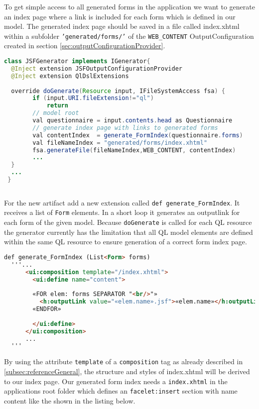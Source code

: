 To get simple access to all generated forms in the application
 we want to generate an index page where a link is included for each form which is defined
in our model.
The generated index page should be saved in a file called index.xhtml within a
subfolder \texttt{'generated/forms/'} of the \texttt{WEB\_CONTENT}
OutputConfiguration created in section \ref{sec:outputConfigurationProvider}.

\begin{lstlisting}[language=Java] 
class JSFGenerator implements IGenerator{
  @Inject extension JSFOutputConfigurationProvider
  @Inject extension QlDslExtensions
  
  override doGenerate(Resource input, IFileSystemAccess fsa) {
        if (input.URI.fileExtension!="ql")
            return
		// model root
        val questionnaire = input.contents.head as Questionnaire
		// generate index page with links to generated forms
        val contentIndex  = generate_FormIndex(questionnaire.forms)
        val fileNameIndex = "generated/forms/index.xhtml"
        fsa.generateFile(fileNameIndex,WEB_CONTENT, contentIndex)
        ...
  }
  ...
 }
      
\end{lstlisting}

For the new artifact add a new extension called \texttt{def
generate\_FormIndex}.
It receives a list of \texttt{Form} elements. In a short loop it generates an
outputlink for each form of the given model. Because \texttt{doGenerate} is
called for each QL resource the generator currently has the limitation that all
QL model elements are defined within the same QL resource to ensure generation of a
correct form index page.

\begin{lstlisting}[language=HTML] 
  def generate_FormIndex (List<Form> forms)
  '''...
      <ui:composition template="/index.xhtml">
        <ui:define name="content">
        
        «FOR elem: forms SEPARATOR "<br/>"»
          <h:outputLink value="«elem.name».jsf">«elem.name»</h:outputLink>
        «ENDFOR»
        
        </ui:define>
      </ui:composition>
      ...
  '''
\end{lstlisting}

By using the attribute \texttt{template} of a \texttt{composition} tag as
already described in \ref{subsec:referenceGeneral}, the structure and styles of
index.xhtml will be derived to our index page. Our generated form index needs a
\texttt{index.xhtml} in the applications root folder which defines an
\texttt{facelet:insert} section with name content like the shown in the listing below.

